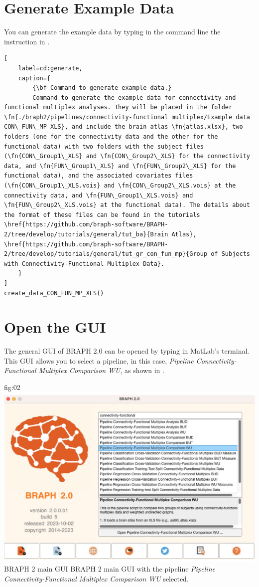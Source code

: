 \documentclass[justified]{tufte-handout}
\begin{document}
\tableofcontents

\clearpage
\section{Generate Example Data}

You can generate the example data by typing in the command line the instruction in .
%
\begin{lstlisting}[
	label=cd:generate,
	caption={
		{\bf Command to generate example data.}
		Command to generate the example data for connectivity and functional multiplex analyses. They will be placed in the folder \fn{./braph2/pipelines/connectivity-functional multiplex/Example data CON\_FUN\_MP XLS}, and include the brain atlas \fn{atlas.xlsx}, two folders (one for the connectivity data and the other for the functional data) with two folders with the subject files (\fn{CON\_Group1\_XLS} and \fn{CON\_Group2\_XLS} for the connectivity data, and \fn{FUN\_Group1\_XLS} and \fn{FUN\_Group2\_XLS} for the functional data), and the associated covariates files (\fn{CON\_Group1\_XLS.vois} and \fn{CON\_Group2\_XLS.vois} at the connectivity data, and \fn{FUN\_Group1\_XLS.vois} and \fn{FUN\_Group2\_XLS.vois} at the functional data). The details about the format of these files can be found in the tutorials \href{https://github.com/braph-software/BRAPH-2/tree/develop/tutorials/general/tut_ba}{Brain Atlas}, \href{https://github.com/braph-software/BRAPH-2/tree/develop/tutorials/general/tut_gr_con_fun_mp}{Group of Subjects with Connectivity-Functional Multiplex Data}.
	}
]
create_data_CON_FUN_MP_XLS()
\end{lstlisting}

\section{Open the GUI}

The general GUI of BRAPH 2.0 can be opened by typing  in MatLab's terminal. This GUI allows you to select a pipeline, in this case, \emph{Pipeline Connectivity-Functional Multiplex Comparison WU}, as shown in .

	{fig:02}
	{
	\includegraphics{fig02.jpg}
	}
	{BRAPH 2 main GUI}
	{
	BRAPH 2 main GUI with the pipeline \emph{Pipeline Connectivity-Functional Multiplex Comparison WU} selected.
	}
\end{document}
